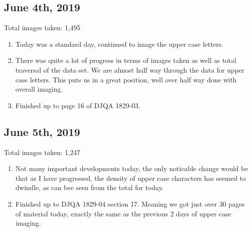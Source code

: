 \documentclass[12pt]{article} %
\begin{document}
\subsection{June 4th, 2019}
Total images taken: 1,495 \newline
\noindent\makebox[\linewidth]{\rule{15cm}{0.4pt}}
\begin{enumerate}[label = (\roman*)]
\item Today was a standard day, continued to image the upper case letters.
\item There was quite a lot of progress in terms of images taken as well as total traversal of the data set. We are almost half way through the data for upper case letters. This puts us in a great position, well over half way done with overall imaging.
\item Finished up to page 16 of DJQA 1829-03.
\end{enumerate}

\subsection{June 5th, 2019}
Total images taken: 1,247 \newline
\noindent\makebox[\linewidth]{\rule{15cm}{0.4pt}}
\begin{enumerate}[label = (\roman*)]
\item Not many important developments today, the only noticable change would be that as I have progressed, the density of upper case characters has seemed to dwindle, as can bee seen from the total for today.
\item Finished up to  DJQA 1829-04 section 17. Meaning we got just over 30 pages of material today, exactly the same as the previous 2 days of upper case imaging.
\end{enumerate}
\end{document}
